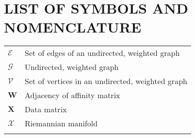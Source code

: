 

\chapter*{LIST OF SYMBOLS AND NOMENCLATURE}  %
\singlespacing
\begin{tabular}{l p{5in}} %

$\mathcal{E}$ & Set of edges of an undirected, weighted graph\\
$\mathcal{G}$ & Undirected, weighted graph\\ 
$\mathcal{V}$ & Set of vertices in an undirected, weighted graph\\ 
$\bm{W}$ & Adjacency of affinity matrix\\
$\bm{X}$ & Data matrix \\
$\mathcal{X}$ & Riemannian manifold\\
\\

\end{tabular}


\doublespacing

